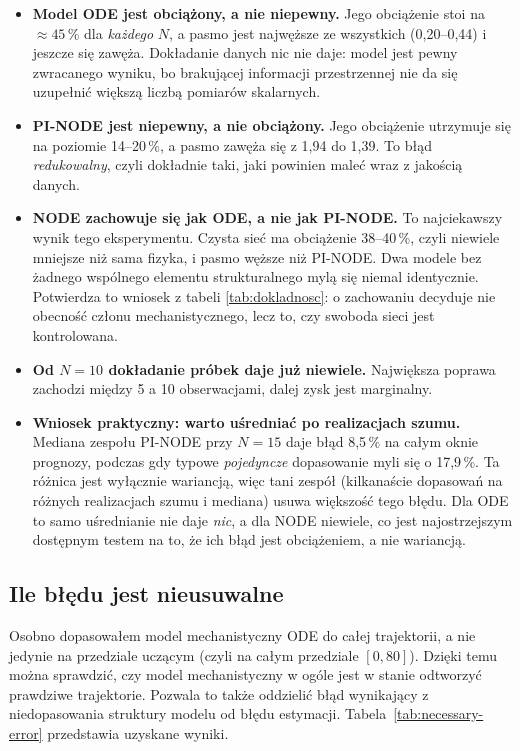 \documentclass[11pt,a4paper]{article}
\begin{document}
\begin{itemize}
\item \textbf{Model ODE jest obciążony, a nie niepewny.} Jego obciążenie stoi
na $\approx 45\,\%$ dla \emph{każdego} $N$, a pasmo jest najwęższe ze wszystkich
(0,20--0,44) i jeszcze się zawęża. Dokładanie danych nic nie daje: model jest pewny
zwracanego wyniku, bo brakującej informacji przestrzennej nie da się uzupełnić większą
liczbą pomiarów skalarnych.

\item \textbf{PI-NODE jest niepewny, a nie obciążony.} Jego obciążenie utrzymuje się na
poziomie 14--20\,\%, a pasmo zawęża się z 1,94 do 1,39. To błąd \emph{redukowalny},
czyli dokładnie taki, jaki powinien maleć wraz z jakością danych.

\item \textbf{NODE zachowuje się jak ODE, a nie jak PI-NODE.} To najciekawszy wynik tego
eksperymentu. Czysta sieć ma obciążenie 38--40\,\%, czyli niewiele mniejsze niż sama
fizyka, i pasmo węższe niż PI-NODE. Dwa modele bez żadnego wspólnego elementu
strukturalnego mylą się niemal identycznie. Potwierdza to wniosek z tabeli
\ref{tab:dokladnosc}: o zachowaniu decyduje nie obecność członu mechanistycznego, lecz
to, czy swoboda sieci jest kontrolowana.

\item \textbf{Od $N=10$ dokładanie próbek daje już niewiele.} Największa poprawa zachodzi
między 5 a 10 obserwacjami, dalej zysk jest marginalny.

\item \textbf{Wniosek praktyczny: warto uśredniać po realizacjach szumu.} Mediana zespołu
PI-NODE przy $N=15$ daje błąd 8,5\,\% na całym oknie prognozy, podczas gdy typowe
\emph{pojedyncze} dopasowanie myli się o 17,9\,\%. Ta różnica jest wyłącznie wariancją,
więc tani zespół (kilkanaście dopasowań na różnych realizacjach szumu i mediana) usuwa
większość tego błędu. Dla ODE to samo uśrednianie nie daje \emph{nic}, a dla NODE
niewiele, co jest najostrzejszym dostępnym testem na to, że ich błąd jest obciążeniem,
a nie wariancją.
\end{itemize}

\subsection{Ile błędu jest nieusuwalne}

Osobno dopasowałem model mechanistyczny ODE do całej trajektorii, a nie jedynie na przedziale uczącym (czyli na całym przedziale $[0, 80]$). Dzięki temu można sprawdzić, czy model mechanistyczny w ogóle jest w stanie odtworzyć prawdziwe trajektorie. Pozwala to także oddzielić błąd wynikający z niedopasowania struktury modelu od błędu estymacji. Tabela~\ref{tab:necessary-error} przedstawia uzyskane wyniki.
\end{document}
